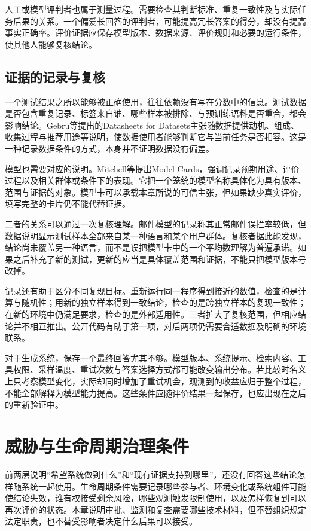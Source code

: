 人工或模型评判者也属于测量过程。需要检查其判断标准、重复一致性及与实际任务后果的关系。一个偏爱长回答的评判者，可能提高冗长答案的得分，却没有提高事实正确率。评价证据应保存模型版本、数据来源、评价规则和必要的运行条件，使其他人能够复核结论。

\subsection{证据的记录与复核}

一个测试结果之所以能够被正确使用，往往依赖没有写在分数中的信息。测试数据是否包含重复记录、标签来自谁、哪些样本被排除、与预训练语料是否重合，都会影响结论。Gebru等提出的Datasheets for Datasets主张随数据提供动机、组成、收集过程与推荐用途等说明，使数据使用者能够判断它与当前任务是否相容。这是一种记录数据条件的方式，本身并不证明数据没有偏差。

模型也需要对应的说明。Mitchell等提出Model Cards，强调记录预期用途、评价过程以及相关群体或条件下的表现。它把一个笼统的模型名称具体化为具有版本、范围与证据的对象。模型卡可以承载本章所说的可信主张，但如果缺少真实评价，填写完整的卡片仍不能代替证据。

二者的关系可以通过一次复核理解。邮件模型的记录称其正常邮件误拦率较低，但数据说明显示测试样本全部来自某一种语言和某个用户群体。复核者据此能发现，结论尚未覆盖另一种语言，而不是误把模型卡中的一个平均数理解为普遍承诺。如果之后补充了新的测试，更新的应当是具体覆盖范围和证据，不能只把模型版本号改掉。

记录还有助于区分不同复现目标。重新运行同一程序得到接近的数值，检查的是计算与随机性；用新的独立样本得到一致结论，检查的是跨独立样本的复现一致性；在新的环境中仍满足要求，检查的是外部适用性。三者扩大了复核范围，但相应结论并不相互推出。公开代码有助于第一项，对后两项仍需要合适数据及明确的环境联系。

对于生成系统，保存一个最终回答尤其不够。模型版本、系统提示、检索内容、工具权限、采样温度、重试次数与答案选择方式都可能改变输出分布。若比较时名义上只考察模型变化，实际却同时增加了重试机会，观测到的收益应归于整个过程，不能全部解释为模型能力提高。这些条件应随评价结果一起保存，也应出现在之后的重新验证中。

\section{威胁与生命周期治理条件}
\label{sec:trust-lifecycle}

前两层说明“希望系统做到什么”和“现有证据支持到哪里”，还没有回答这些结论怎样随系统一起使用。生命周期条件需要记录哪些参与者、环境变化或系统组件可能使结论失效，谁有权接受剩余风险，哪些观测触发限制使用，以及怎样恢复到可以再次评价的状态。本章说明审批、监测和复查需要哪些技术材料，但不替组织规定法定职责，也不替受影响者决定什么后果可以接受。

